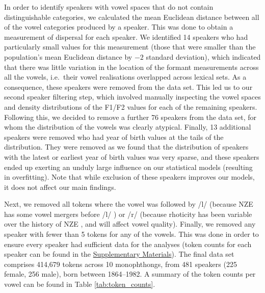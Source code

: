 \documentclass[review]{elsarticle} %
\begin{document}
In order to identify speakers with vowel spaces that do not contain distinguishable categories, we calculated the mean Euclidean distance between all of the vowel categories produced by a speaker.  This was done to obtain a measurement of dispersal for each speaker.  We identified 14 speakers who had particularly small values for this measurement (those that were smaller than the population's mean Euclidean distance by $-2$ standard deviation), which indicated that there was little variation in the location of the formant measurements across all the vowels, i.e.\ their vowel realisations overlapped across lexical sets. As a consequence, these speakers were removed from the data set. This led us to our second speaker filtering step, which involved manually inspecting the vowel spaces and density distributions of the F1/F2 values for each of the remaining speakers. Following this, we decided to remove a further 76 speakers from the data set, for whom the distribution of the vowels was clearly atypical. Finally, 13 additional speakers were removed who had year of birth values at the tails of the distribution.  They were removed as we found that the distribution of speakers with the latest or earliest year of birth values was very sparse, and these speakers ended up exerting an unduly large influence on our statistical models (resulting in overfitting). Note that while exclusion of these speakers improves our models, it does not affect our main findings.

Next, we removed all tokens where the vowel was followed by /l/ (because NZE has some vowel mergers before /l/ \citep{thomas2005pleasant, bauer2007new}) or /r/ (because rhoticity has been variable over the history of NZE \citep{hay2005rhoticity}, and will affect vowel quality).  Finally, we removed any speaker with fewer than 5 tokens for any of the vowels. This was done in order to ensure every speaker had sufficient data for the analyses (token counts for each speaker can be found in the \hyperref[sec:supplementarymaterials]{Supplementary Materials}). The final data set comprises 414,679 tokens across 10 monophthongs, from 481 speakers (225 female, 256 male), born between 1864--1982. A summary of the token counts per vowel can be found in Table \ref{tab:token_counts}.
\end{document}
